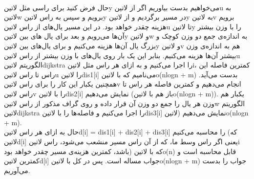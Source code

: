 {\\حال فرض کنید برای راسی مثل ‌لاتین{y} می‌خواهیم بدست بیاوریم اگر از ‌لاتین{u} به ‌لاتین{w} برویم و سپس به راس ‌لاتین{y} در مسیر برگردیم و از ‌لاتین{y} به ‌لاتین{v} برویم هزینه چقدر خواهد بود. در این مسیر یال‌های از راس ‌لاتین{u} تا ‌لاتین{y} را با وزن بیشتر آن‌ها می‌رویم و بعد برای یال های بین ‌لاتین{y} و ‌لاتین{w} به اندازه‌ی جمع دو وزن کوچک و بزرگ یال آن‌ها هزینه می‌کنیم و برای یال‌های بین ‌لاتین{y} و ‌لاتین{v} هم به اندازه‌ی وزن بیشتر آن‌ها هزینه می‌کنیم. بنابر این یک بار روی یال‌های با وزن بیشتر از راس ‌لاتین{u} الگوریتم ‌لاتین{dijkstra} را اجرا می‌کنیم و به ازای هر راس مثل ‌لاتین{i}، کمترین فاصله این راس تا راس ‌لاتین{u} را ‌لاتین{dis1[i]} می‌نامیم که با ‌لاتین{o(nlogn + m)} بدست می‌آید. همچنین یکبار این کار را برای راس ‌لاتین{v} انجام می‌دهیم و کمترین فاصله هر راس تا راس ‌لاتین{v} را با ‌لاتین{dis2[i]} نمایش می‌دهیم (باز هم با ‌لاتین{o(nlogn + m)}). یکبار هم وزن هر یال را جمع دو وزن آن قرار داده و روی گراف مذکور از راس ‌لاتین{w} الگوریتم ‌لاتین{dijkstra} را اجرا می‌کنیم و فاصله‌ها را با ‌لاتین{dis3[i]} نمایش می‌دهیم (‌لاتین{o(nlogn + m}).
\\ حال به ازای هر راس ‌لاتین{d[i] = dis1[i] + dis2[i] + dis3[i]} را محاسبه می‌کنیم (که ‌لاتین{d[i]} یعنی اگر راس وسط ما، که از آن راس مسیر منشعب می‌شود، راس ‌لاتین{i} باشد، کمترین هزینه‌ی مسیر چقدر خواهد بود) که با ‌لاتین{o(n)} قابل محاسبه است و کمترین ‌لاتین{d[i]} جواب مساله است. پس در کل با ‌لاتین{o(nlogn + m)} جواب را بدست می‌آوریم.\\
}









